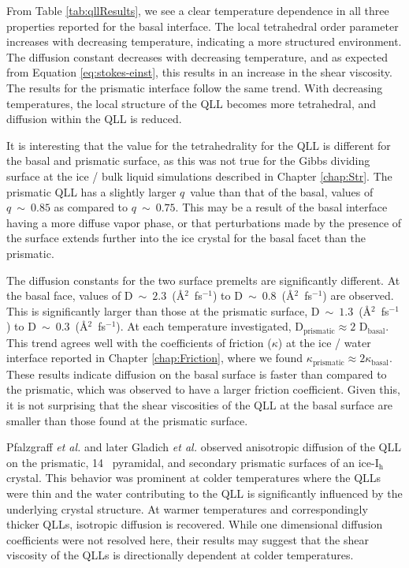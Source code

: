 From Table \ref{tab:qllResults}, we see a clear temperature dependence
in all three properties reported for the basal interface. The local
tetrahedral order parameter increases with decreasing temperature,
indicating a more structured environment. The diffusion constant
decreases with decreasing temperature, and as expected from Equation
\eqref{eq:stokes-einst}, this results in an increase in the shear
viscosity.  The results for the prismatic interface follow the same
trend. With decreasing temperatures, the local structure of the QLL
becomes more tetrahedral, and diffusion within the QLL is reduced. 

It is interesting that the value for the tetrahedrality for the QLL is
different for the basal and prismatic surface, as this was not true
for the Gibbs dividing surface at the ice / bulk liquid simulations
described in Chapter \ref{chap:Str}. The prismatic QLL has a slightly
larger $q$~value than that of the basal, values of $q~\sim~0.85$ as
compared to $q~\sim~0.75$.  This may be a result of the basal interface
having a more diffuse vapor phase, or that perturbations made by the
presence of the surface extends further into the ice crystal for the
basal facet than the prismatic.

The diffusion constants for the two surface premelts are significantly
different. At the basal face, values of
$\mathrm{D}~\sim~2.3$~(\AA$^{2}$~fs$^{-1}$) to
$\mathrm{D}~\sim~0.8$~(\AA$^{2}$~fs$^{-1}$) are observed. This is
significantly larger than those at the prismatic surface,
$\mathrm{D}~\sim~1.3$~(\AA$^{2}$~fs$^{-1}$) to
$\mathrm{D}~\sim~0.3$~(\AA$^{2}$~fs$^{-1}$). At each temperature
investigated, D$_\mathrm{prismatic} \approx 2$
D$_\mathrm{basal}$. This trend agrees well with the coefficients of
friction ($\kappa$) at the ice / water interface reported in Chapter
\ref{chap:Friction}, where we found
$\kappa_\mathrm{prismatic} \approx 2 \kappa_\mathrm{basal}$. These
results indicate diffusion on the basal surface is faster than
compared to the prismatic, which was observed to have a larger
friction coefficient. Given this, it is not surprising that the shear
viscosities of the QLL at the basal surface are smaller than those
found at the prismatic surface.

Pfalzgraff \textit{et al.}\cite{Pfalzgraff2011} and later Gladich
\textit{et al.}\cite{Gladich2011,Gladich2015} observed anisotropic
diffusion of the QLL on the prismatic, 14\degree~ pyramidal, and
secondary prismatic surfaces of an ice-I$_\mathrm{h}$ crystal. This
behavior was prominent at colder temperatures where the QLLs were thin
and the water contributing to the QLL is significantly influenced by the
underlying crystal structure. At warmer temperatures and
correspondingly thicker QLLs, isotropic diffusion is recovered. While
one dimensional diffusion coefficients were not resolved here, their
results may suggest that the shear viscosity of the QLLs is
directionally dependent at colder temperatures. 

